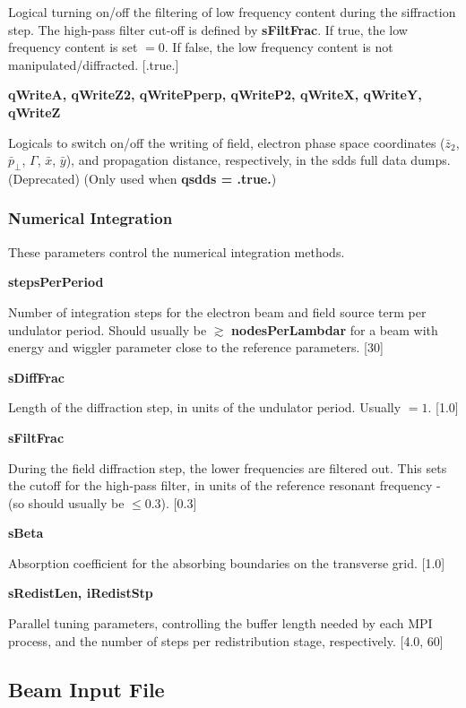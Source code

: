 \documentclass[12pt]{article}%
\begin{document}
Logical turning on/off the filtering of low frequency content during the siffraction step. The high-pass filter cut-off is defined by {\bf sFiltFrac}. If true, the low frequency content is set $=0$. If false, the low frequency content is not manipulated/diffracted. [.true.]

{\bf qWriteA, qWriteZ2, qWritePperp, qWriteP2, qWriteX, qWriteY, qWriteZ}

Logicals to switch on/off the writing of field, electron phase space coordinates ($\bar{z}_2$, $\bar{p}_\bot$, $\Gamma$, $\bar{x}$, $\bar{y}$), and propagation distance, respectively, in the sdds full data dumps. (Deprecated) (Only used when {\bf qsdds = .true.})

\subsubsection{Numerical Integration}

These parameters control the numerical integration methods.

{\bf stepsPerPeriod}

Number of integration steps for the electron beam and field source term per undulator period. Should usually be $\gtrsim$ {\bf nodesPerLambdar} for a beam with energy and wiggler parameter close to the reference parameters. [30]

{\bf sDiffFrac}

Length of the diffraction step, in units of the undulator period. Usually $=1$. [1.0]

{\bf sFiltFrac}

During the field diffraction step, the lower frequencies are filtered out. This sets the cutoff for the high-pass filter, in units of the reference resonant frequency - (so should usually be $\leq 0.3$). [0.3]

{\bf sBeta}

Absorption coefficient for the absorbing boundaries on the transverse grid. [1.0]

{\bf sRedistLen, iRedistStp}

Parallel tuning parameters, controlling the buffer length needed by each MPI process, and the number of steps per redistribution stage, respectively. [4.0, 60]

\newpage

\subsection{Beam Input File}
\end{document}
